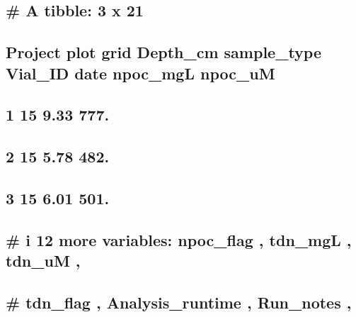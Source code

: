 \documentclass[
]{article}
\begin{document}
\hypertarget{a-tibble-3-x-21}{%
\subsection{\# A tibble: 3 x 21}\label{a-tibble-3-x-21}}

\hypertarget{project-plot-grid-depth_cm-sample_type-vial_id-date-npoc_mgl-npoc_um}{%
\subsection{Project plot grid Depth\_cm sample\_type Vial\_ID date
npoc\_mgL
npoc\_uM}\label{project-plot-grid-depth_cm-sample_type-vial_id-date-npoc_mgl-npoc_um}}

\hypertarget{section-1}{%
\subsection{\texorpdfstring{ }{        }}\label{section-1}}

\hypertarget{section-2}{%
\subsection{\texorpdfstring{1 15 9.33
777.}{1    15    9.33 777.}}\label{section-2}}

\hypertarget{section-3}{%
\subsection{\texorpdfstring{2 15 5.78
482.}{2    15    5.78 482.}}\label{section-3}}

\hypertarget{section-4}{%
\subsection{\texorpdfstring{3 15 6.01
501.}{3    15    6.01 501.}}\label{section-4}}

\hypertarget{i-12-more-variables-npoc_flag-tdn_mgl-tdn_um}{%
\subsection{\# i 12 more variables: npoc\_flag , tdn\_mgL , tdn\_uM
,}\label{i-12-more-variables-npoc_flag-tdn_mgl-tdn_um}}

\hypertarget{tdn_flag-analysis_runtime-run_notes}{%
\subsection{\# tdn\_flag , Analysis\_runtime , Run\_notes
,}\label{tdn_flag-analysis_runtime-run_notes}}
\end{document}

